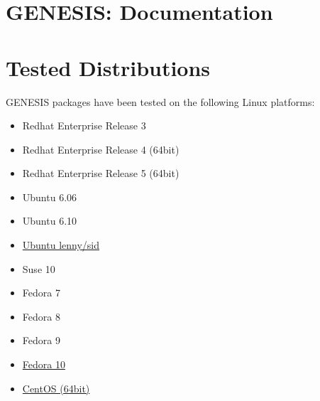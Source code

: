 \documentclass[12pt]{article}
\begin{document}
\section*{GENESIS: Documentation}

\section*{Tested Distributions}

GENESIS packages have been tested on the following Linux platforms:

\begin{itemize}
\item Redhat Enterprise Release 3
\item Redhat Enterprise Release 4 (64bit)
\item Redhat Enterprise Release 5 (64bit)
\item Ubuntu 6.06
\item Ubuntu 6.10
\item \href{../tested-lenny-sid/tested-lenny-sid.tex}{Ubuntu lenny/sid}
\item Suse 10
\item Fedora 7
\item Fedora 8
\item Fedora 9
\item \href{../tested-fedora10/tested-fedora10.tex}{Fedora 10}
\item \href{../tested-centos-64bit/tested-centos53-64bit.tex}{CentOS (64bit)}
\end{itemize}
\end{document}

